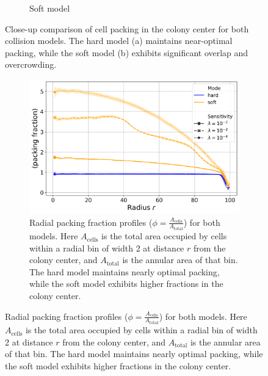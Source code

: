 \documentclass[conference]{IEEEtran}
\begin{document}
\begin{figure}[H]
\begin{subfigure}[b]{0.49\columnwidth}
        \caption{Soft model}
    \end{subfigure}
    \caption{Close-up comparison of cell packing in the colony center for both collision models. The hard model (a) maintains near-optimal packing, while the soft model (b) exhibits significant overlap and overcrowding.}
    \label{fig:dense_packing_comparison}
\end{figure}

\begin{figure}[H]
    \centering
    \begin{subfigure}[b]{\linewidth}
        \centering
        \includegraphics[width=\linewidth]{figures/comparison_plots/combined_radial_packing_fraction.png}
        \caption{Radial packing fraction profiles ($\phi = \frac{A_{\text{cells}}}{A_{\text{total}}}$) for both models. Here $A_{\text{cells}}$ is the total area occupied by cells within a radial bin of width 2 at distance $r$ from the colony center, and $A_{\text{total}}$ is the annular area of that bin. The hard model maintains nearly optimal packing, while the soft model exhibits higher fractions in the colony center.}
        \label{fig:radial_distribution_packing_fraction}
    \end{subfigure}


\end{figure}
\end{document}
